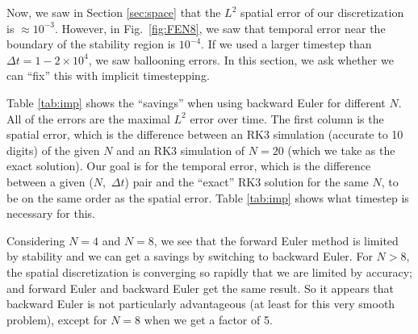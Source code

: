Now, we saw in Section \ref{sec:space} that the $L^2$ spatial error of our discretization is $\approx 10^{-3}$. However, in Fig.\ \ref{fig:FEN8}, we saw that temporal error near the boundary of the stability region is $10^{-4}$. If we used a larger timestep than $\Delta t = 1-2 \times 10^{4}$, we saw ballooning errors. In this section, we ask whether we can ``fix'' this with implicit timestepping. 

Table \ref{tab:imp} shows the ``savings'' when using backward Euler for different $N$. All of the errors are the maximal $L^2$ error over time. The first column is the spatial error, which is the difference between an RK3 simulation (accurate to 10 digits) of the given $N$ and an RK3 simulation of $N=20$ (which we take as the exact solution). Our goal is for the temporal error, which is the difference between a given ($N$,\, $\Delta t$) pair and the ``exact'' RK3 solution for the same $N$, to be on the same order as the spatial error. Table \ref{tab:imp} shows what timestep is necessary for this.

Considering $N=4$ and $N=8$, we see that the forward Euler method is limited by stability and we can get a savings by switching to backward Euler. For $N > 8$, the spatial discretization is converging so rapidly that we are limited by accuracy; and forward Euler and backward Euler get the same result. So it appears that backward Euler is not particularly advantageous (at least for this very smooth problem), except for $N=8$ when we get a factor of 5. 




